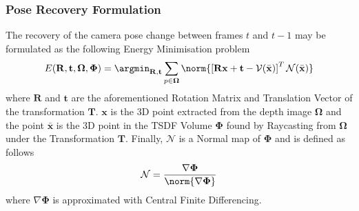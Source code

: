 \subsubsection{Pose Recovery Formulation}
\label{subsub:moseg_static_camera_poserec}
The recovery of the camera pose change between frames $t$ and $t-1$ may be
formulated as the following Energy Minimisation problem
\begin{equation}
  \label{eqn:pose_estimation_kf}
  E(\mathbf{R}, \mathbf{t}, \mathbf{\Omega}, \mathbf{\Phi}) =
  \argmin_{\mathbf{R}, \mathbf{t}} \sum_{p \in \mathbf{\Omega}}
  \norm{\left[
    \mathbf{Rx} + \mathbf{t} - \mathcal{V}(\bar{\mathbf{x}})
  \right]^{T}
  \mathcal{N}(\bar{\mathbf{x}})}
\end{equation}
where $\mathbf{R}$ and $\mathbf{t}$ are the aforementioned Rotation Matrix and
Translation Vector of the transformation $\mathbf{T}$. $\mathbf{x}$ is the 3D
point extracted from the depth image $\mathbf{\Omega}$ and the point
$\bar{\mathbf{x}}$ is the 3D point in the TSDF Volume $\mathbf{\Phi}$ found by
Raycasting from $\mathbf{\Omega}$ under the Transformation $\mathbf{T}$.
Finally, $\mathcal{N}$ is a Normal map of $\mathbf{\Phi}$ and is defined as
follows
\begin{equation}
  \label{eqn:normal_map_definition}
  \mathcal{N} = \frac{\nabla \mathbf{\Phi}}{\norm{\nabla \mathbf{\Phi}}}
\end{equation}
where $\nabla \mathbf{\Phi}$ is approximated with Central Finite Differencing.

